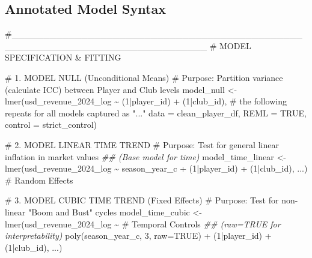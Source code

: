 \documentclass[
  12pt,
]{article}
\newenvironment{Shaded}{\begin{snugshade}}{\end{snugshade}}
\newcommand{\AttributeTok}[1]{\textcolor[rgb]{0.40,0.45,0.13}{#1}}
\newcommand{\CommentTok}[1]{\textcolor[rgb]{0.37,0.37,0.37}{#1}}
\newcommand{\ConstantTok}[1]{\textcolor[rgb]{0.56,0.35,0.01}{#1}}
\newcommand{\DecValTok}[1]{\textcolor[rgb]{0.68,0.00,0.00}{#1}}
\newcommand{\DocumentationTok}[1]{\textcolor[rgb]{0.37,0.37,0.37}{\textit{#1}}}
\newcommand{\FunctionTok}[1]{\textcolor[rgb]{0.28,0.35,0.67}{#1}}
\newcommand{\NormalTok}[1]{\textcolor[rgb]{0.00,0.23,0.31}{#1}}
\newcommand{\OtherTok}[1]{\textcolor[rgb]{0.00,0.23,0.31}{#1}}
\newcommand{\SpecialCharTok}[1]{\textcolor[rgb]{0.37,0.37,0.37}{#1}}
\begin{document}
\subsection{Annotated Model Syntax}\label{annotated-model-syntax}

\begin{Shaded}
\begin{Highlighting}[]
\CommentTok{\#\_\_\_\_\_\_\_\_\_\_\_\_\_\_\_\_\_\_\_\_\_\_\_\_\_\_\_\_\_\_\_\_\_\_\_\_\_\_\_\_\_\_\_\_\_\_\_\_\_\_\_\_\_\_\_\_\_\_\_\_\_\_\_\_\_\_\_\_\_\_\_\_\_\_\_\_\_\_}
\CommentTok{\# MODEL SPECIFICATION \& FITTING}

\CommentTok{\# 1. MODEL NULL (Unconditional Means)}
\CommentTok{\# Purpose: Partition variance (calculate ICC) between Player and Club levels}
\NormalTok{model\_null }\OtherTok{\textless{}{-}} \FunctionTok{lmer}\NormalTok{(usd\_revenue\_2024\_log }\SpecialCharTok{\textasciitilde{}}\NormalTok{ (}\DecValTok{1}\SpecialCharTok{|}\NormalTok{player\_id) }\SpecialCharTok{+}\NormalTok{ (}\DecValTok{1}\SpecialCharTok{|}\NormalTok{club\_id), }
                   \CommentTok{\# the following repeats for all models captured as "..."}
                   \AttributeTok{data =}\NormalTok{ clean\_player\_df, }
                   \AttributeTok{REML =} \ConstantTok{TRUE}\NormalTok{, }
                   \AttributeTok{control =}\NormalTok{ strict\_control)}


\CommentTok{\# 2. MODEL LINEAR TIME TREND}
\CommentTok{\# Purpose: Test for general linear inflation in market values }
\DocumentationTok{\#\# (Base model for time)}
\NormalTok{model\_time\_linear }\OtherTok{\textless{}{-}} \FunctionTok{lmer}\NormalTok{(usd\_revenue\_2024\_log }\SpecialCharTok{\textasciitilde{}}\NormalTok{ season\_year\_c }\SpecialCharTok{+} 
\NormalTok{                          (}\DecValTok{1}\SpecialCharTok{|}\NormalTok{player\_id) }\SpecialCharTok{+}\NormalTok{ (}\DecValTok{1}\SpecialCharTok{|}\NormalTok{club\_id), ...) }\CommentTok{\# Random Effects}

\CommentTok{\# 3. MODEL CUBIC TIME TREND (Fixed Effects)}
\CommentTok{\# Purpose: Test for non{-}linear "Boom and Bust" cycles}
\NormalTok{model\_time\_cubic }\OtherTok{\textless{}{-}} \FunctionTok{lmer}\NormalTok{(usd\_revenue\_2024\_log }\SpecialCharTok{\textasciitilde{}} 
                           \CommentTok{\# Temporal Controls}
                           \DocumentationTok{\#\# (raw=TRUE for interpretability)}
                           \FunctionTok{poly}\NormalTok{(season\_year\_c, }\DecValTok{3}\NormalTok{, }\AttributeTok{raw=}\ConstantTok{TRUE}\NormalTok{) }\SpecialCharTok{+} 
\NormalTok{                         (}\DecValTok{1}\SpecialCharTok{|}\NormalTok{player\_id) }\SpecialCharTok{+}\NormalTok{ (}\DecValTok{1}\SpecialCharTok{|}\NormalTok{club\_id), ...)}


\end{Highlighting}
\end{Shaded}
\end{document}
